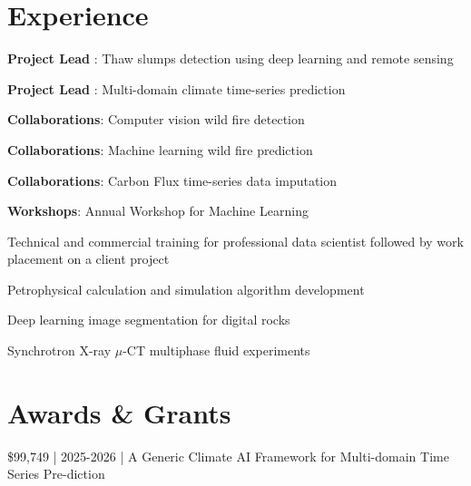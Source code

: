 \documentclass[]{deedy-resume-openfont}
\begin{document}
\begin{minipage}[t]{0.66\textwidth} 


\section{Experience}

\vspace{\topsep} %
\begin{tightemize}
    \item \textbf{Project Lead} : Thaw slumps detection using deep learning and remote sensing
    \item \textbf{Project Lead} : Multi-domain climate time-series prediction
    \item \textbf{Collaborations}: Computer vision wild fire detection
    \item \textbf{Collaborations}: Machine learning wild fire prediction
    \item \textbf{Collaborations}: Carbon Flux time-series data imputation
    \item \textbf{Workshops}: Annual Workshop for Machine Learning
\end{tightemize}
\sectionsep

\begin{tightemize}
    \item Technical and commercial training for professional data scientist followed by work placement on a client project
\end{tightemize}
\sectionsep

\begin{tightemize}
    \item Petrophysical calculation and simulation algorithm development
    \item Deep learning image segmentation for digital rocks
    \item Synchrotron X-ray $\mu$-CT multiphase fluid experiments
\end{tightemize}
\sectionsep



\section{Awards \& Grants} 

\$99,749 | 2025-2026 | A Generic Climate AI Framework for Multi-domain Time Series Pre-diction


\sectionsep



\end{minipage} 
\end{document}

